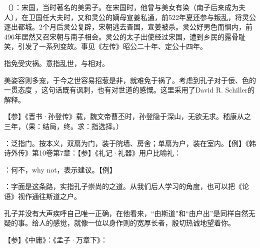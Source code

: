 {
\begin{lyitemize}
\item {}（）：宋国，当时著名的美男子。在宋国时，他曾与美女有染（南子后来成为夫人），在卫国任大夫时，又和灵公的嫡母宣姜私通，前522年夏还参与叛乱，将灵公逐出都城。2个月后灵公复辟，宋朝逃去晋国，宣姜被杀。灵公好男色而惧内，前496年居然又召宋朝与南子相会。灵公的太子出使经过宋国，遭到乡民的露骨耻笑，引发了一系列变故。事见《左传》昭公二十年、定公十四年。
\item {}指免受灾祸。意指乱世，与相对。

美姿容则多宠，于今之世容易招惹是非，就难免于祸了。考虑到孔子对于佞、色的一贯态度  ，这句话既有讽刺，也有对世道的感慨。这里采用了David R. Schiller的解释。
\end{lyitemize}
【参】《晋书·孙登传》载，魏文帝曹丕时，孙登隐于深山，无欲无求。嵇康从之三年，（果：结局，终。求：指选择。）
}
{}


{
\item {}：泛指门。按本义，双扇为门，装于院墙、房舍；单扇为户，装在室内。【例】《韩诗外传》第10卷第7章：【参】《礼记·礼器》用户比喻礼：

\item {}：何不，why not，表示建议。【例】 

\item {}：字面是这条路，实指孔子崇尚的之道。从我们后人学习的角度，也可以把《论语》视作通往斯道之户。

孔子并没有大声疾呼自己唯一正确，在他看来，“由斯道”和“由户出”是同样自然无疑的事。给人的感觉，就像一位以身作则的宽厚长者，殷切热诚地望着你。

【参】《中庸》：《孟子·万章下》：
}
{}


